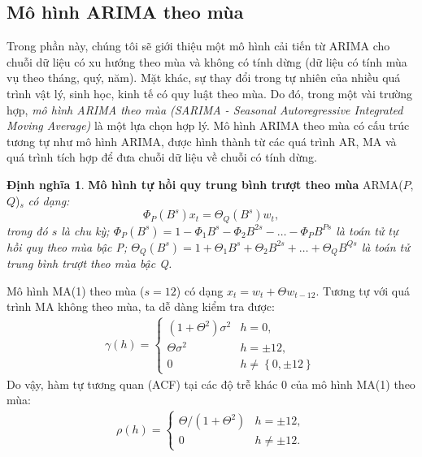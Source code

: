 \documentclass[12pt, a4paper,oneside]{book}
\theoremstyle{definition}
\newtheorem{dn}[theo]{Định nghĩa}
\begin{document}
\subsection{Mô hình ARIMA theo mùa}
Trong phần này, chúng tôi sẽ giới thiệu một mô hình cải tiến từ ARIMA cho chuỗi dữ liệu có xu hướng theo mùa và không có tính dừng (dữ liệu có tính mùa vụ theo tháng, quý, năm). Mặt khác, sự thay đổi trong tự nhiên của nhiều quá trình vật lý, sinh học, kinh tế có quy luật theo mùa. Do đó, trong một vài trường hợp, \textit{mô hình ARIMA theo mùa (SARIMA - Seasonal Autoregressive Integrated Moving Average)} là một lựa chọn hợp lý. Mô hình ARIMA theo mùa có cấu trúc tương tự như mô hình ARIMA, được hình thành từ các quá trình AR, MA và quá trình tích hợp để đưa chuỗi dữ liệu về chuỗi có tính dừng. 

\begin{dn}\cite{8} \textbf{Mô hình tự hồi quy trung bình trượt theo mùa} ARMA($P$, $Q$)$_s$ \textit{có dạng: 
		\begin{equation}
		\Phi_{P}(B^{s})x_{t}=\varTheta_{Q}(B^{s})w_{t}, \label{ct1.193}
		\end{equation}
		trong đó $ s $ là chu kỳ; $\Phi_ {P} (B^{s}) = 1- \Phi_{1}  B^{s}- \Phi_{2}  B^{2s}- \dots- \Phi_{P}  B^{Ps} \label{ct1.194} $ là toán tử tự hồi quy theo mùa bậc P; $\varTheta_{Q}(B^{s})= 1+ \varTheta_{1}B^{s} + \varTheta_{2}B^{2s}+ \dots+ \varTheta_{Q}B^{Qs} \label{ct1.195}	 $ là toán tử trung bình trượt theo mùa bậc Q.}
\end{dn}

Mô hình MA(1) theo mùa ($s=12$) có dạng $x_t=w_t+\Theta w_{t-12}$. Tương tự với quá trình MA không theo mùa, ta dễ dàng kiểm tra được:
\begin{align}
\gamma(h)=
\begin{cases} 
(1+\Theta^{2})\sigma^{2}& h=0,\\
\Theta\sigma^{2}& h=\pm12,\\
0 \hspace{1cm}& h\neq\left\lbrace 0, \pm 12\right\rbrace 
\end{cases}
\end{align}
Do vậy, hàm tự tương quan (ACF) tại các độ trễ khác 0 của mô hình MA(1) theo mùa:
\begin{align}
\rho(h)=
\begin{cases} 
\Theta/(1+\Theta^{2})& h=\pm12,\\
0 \hspace{1cm}& h\neq\pm12. 
\end{cases}
\end{align}
\end{document}
